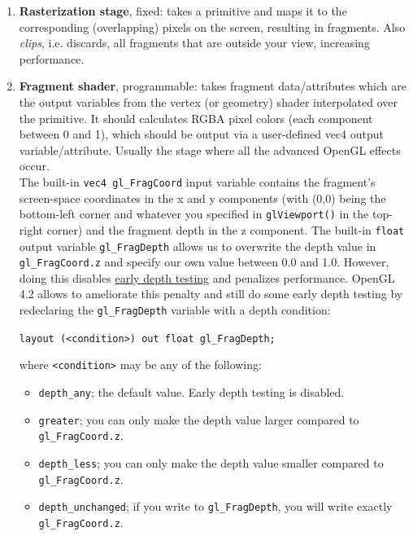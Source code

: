 \documentclass[table, xcdraw]{article}%
\begin{document}
\begin{enumerate}
    \item \textbf{Rasterization stage}, fixed: takes a primitive and maps it to the corresponding (overlapping) pixels on the screen, resulting in fragments. Also \emph{clips}, i.e. discards, all fragments that are outside your view, increasing performance.
    \item \textbf{Fragment shader}, programmable: takes fragment data/attributes which are the output variables from the vertex (or geometry) shader interpolated over the primitive. It should calculates RGBA pixel colors (each component between 0 and 1), which should be output via a user-defined vec4 output variable/attribute. Usually the stage where all the advanced OpenGL effects occur.\\
    The built-in \texttt{vec4 gl_FragCoord} input variable contains the fragment's screen-space coordinates in the x and y components (with (0,0) being the bottom-left corner and whatever you specified in \texttt{glViewport()} in the top-right corner) and the fragment depth in the z component. The built-in \texttt{float} output variable \texttt{gl_FragDepth} allows us to overwrite the depth value in \texttt{gl_FragCoord.z} and specify our own value between 0.0 and 1.0. However, doing this disables \hyperref[depth_buffer]{early depth testing} and penalizes performance. OpenGL 4.2 allows to ameliorate this penalty and still do some early depth testing by redeclaring the \texttt{gl_FragDepth} variable with a depth condition:
    
    \texttt{layout (<condition>) out float gl_FragDepth;}
    
    where \texttt{<condition>} may be any of the following:
    
    \begin{itemize}
        \item \texttt{depth_any}; the default value. Early depth testing is disabled.
        \item \texttt{greater}; you can only make the depth value larger compared to \texttt{gl_FragCoord.z}.
        \item \texttt{depth_less}; you can only make the depth value smaller compared to \texttt{gl_FragCoord.z}.
        \item \texttt{depth_unchanged}; if you write to \texttt{gl_FragDepth}, you will write exactly \texttt{gl_FragCoord.z}.
    \end{itemize}
    

\end{enumerate}
\end{document}
